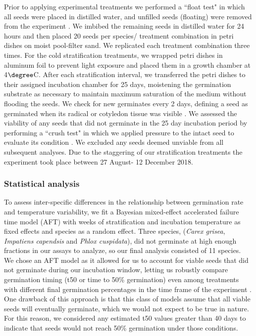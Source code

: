 \documentclass{article}\usepackage[]{graphicx}\usepackage[]{color}
\begin{document}
\noindent  Prior to applying experimental treatments we performed a ``float test" in which all seeds were placed in distilled water, and unfilled seeds (floating) were removed from the experiment \citep{Baskin2014}. We imbibed the remaining seeds in distilled water for 24 hours and then placed 20 seeds per species/ treatment combination in petri dishes on moist pool-filter sand. We replicated each treatment combination three times. For the cold stratification treatments, we wrapped petri dishes in aluminum foil to prevent light exposure and placed them in a growth chamber at 4$\degree$C. After each stratification interval, we transferred the petri dishes to their assigned incubation chamber for 25 days, moistening the germination substrate as necessary to maintain maximum saturation of the medium without flooding the seeds. We check for new germinates every 2 days, defining a seed as germinated when its radical or cotyledon tissue was visible \citep{Baskin2014}. We assessed the viability of any seeds that did not germinate in the 25 day incubation period by performing a ``crush test" in which we applied pressure to the intact seed to evaluate its condition \citep{Baskin2014}. We excluded any seeds deemed unviable from all subsequent analyses. Due to the staggering of our stratification treatments the experiment took place between 27 August- 12 December 2018.\\

\subsubsection*{Statistical analysis}
To assess inter-specific differences in the relationship between germination rate and temperature variability, we fit a Bayesian mixed-effect accelerated failure time model (AFT) with weeks of stratification and incubation temperature as fixed effects and species as a random effect. Three species, (\textit{Carex grisea}, \textit{Impatiens capendsis} and \textit{Phlox cuspidata}), did not germinate at high enough fractions in our assays to analyze, so our final analysis consisted of 11 species.\\ 

We chose an AFT model as it allowed for us to account for viable seeds that did not germinate during our incubation window, letting us robustly compare germination timing (t50 or time to 50\% germination) even among treatments with different final germination percentages in the time frame of the experiment \citep{Soltani:2015aa}. One drawback of this approach is that this class of models assume that all viable seeds will eventually germinate, which we would not expect to be true in nature. For this reason, we considered any estimated t50 values greater than 40 days to indicate that seeds would not reach 50\% germination under those conditions. \\ 
\end{document}
